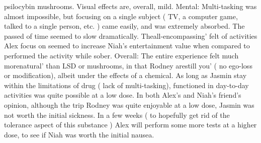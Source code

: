 \documentclass[12pt]{book}
\begin{document}
psilocybin mushrooms. Visual effects are, overall, mild. Mental: Multi-tasking was almost impossible, but focusing on a single subject ( TV, a computer game, talked to a single person, etc. ) came easily, and was extremely absorbed. The passed of time seemed to slow dramatically. Theall-encompassing' felt of activities Alex focus on seemed to increase Niah's entertainment value when compared to performed the activity while sober. Overall: The entire experience felt much morenatural' than LSD or mushrooms, in that Rodney arestill you' ( no ego-loss or modification), albeit under the effects of a chemical. As long as Jasmin stay within the limitations of drug ( lack of multi-tasking), functioned in day-to-day activities was quite possible at a low dose. In both Alex's and Niah's friend's opinion, although the trip Rodney was quite enjoyable at a low dose, Jasmin was not worth the initial sickness. In a few weeks ( to hopefully get rid of the tolerance aspect of this substance ) Alex will perform some more tests at a higher dose, to see if Niah was worth the initial nausea.
\end{document}
